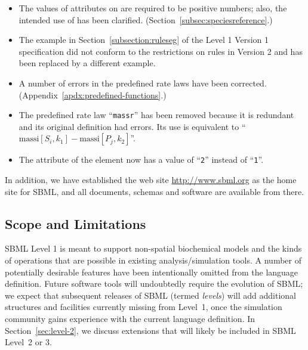 \documentclass[10pt]{cekarticle}
\newcommand{\changed}[1]{\textcolor{BrickRed}{#1}}
\newenvironment{blockChanged}{\color{BrickRed}}{}
\begin{document}
\begin{blockChanged}
\begin{itemize}
\item The values of attributes on  are required to
  be positive numbers; also, the intended use of 
  has been clarified.  (Section~\ref{subsec:speciesreference}.)
  
\item The example in Section~\ref{subsection:ruleseg} of the Level 1
  Version 1 specification did not conform to the restrictions on rules in
  Version 2 and has been replaced by a different example.

\item A number of errors in the predefined rate laws have been corrected.
  (Appendix~\ref{apdx:predefined-functions}.)
  
\item The predefined rate law ``\texttt{massr}'' has been removed because
  it is redundant and its original definition had errors.  Its use is
  equivalent to ``$\text{massi}[S_i,k_1] - \text{massi}[P_j,k_2]$''.

\item The  attribute of the  element now has a
  value of ``\texttt{2}'' instead of ``\texttt{1}''.
  
\end{itemize}

In addition, we have established the web site \url{http://www.sbml.org} as
the home site for SBML, and all documents, schemas and software are
available from there.

\end{blockChanged}


\subsection{Scope and Limitations}

SBML Level 1 is meant to support non-spatial biochemical models and the
kinds of operations that are possible in existing analysis/simulation
tools.  A number of potentially desirable features have been intentionally
omitted from the language definition.  Future software tools will
undoubtedly require the evolution of SBML; we expect that subsequent
releases of SBML (termed \emph{levels}) will add additional structures and
facilities currently missing from Level~1, once the simulation community
gains experience with the current language definition.  In
Section~\ref{sec:level-2}, we discuss extensions that will likely be
included in SBML Level~2 \changed{or 3}.
\end{document}
